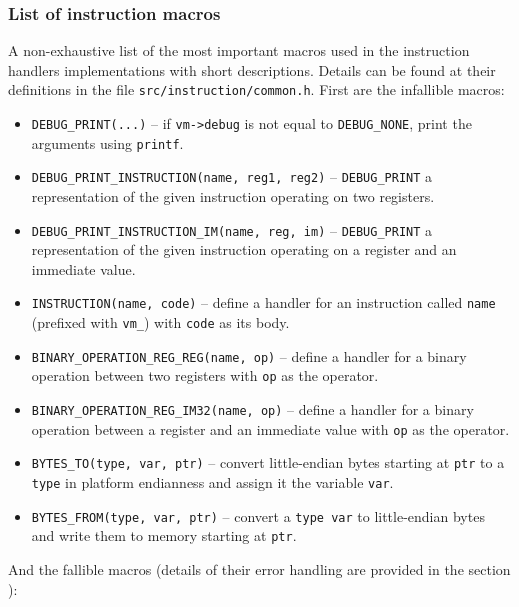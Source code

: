 \documentclass[10pt,a4paper,final]{article}
\newcommand{\code}[1]{\texttt{#1}}
\begin{document}
\subsubsection{List of instruction macros}
\label{sec:macroslist}

A non-exhaustive list of the most important macros used in the instruction
handlers implementations with short descriptions. Details can be found at their
definitions in the file \code{src/instruction/common.h}. First are the
infallible macros:

\begin{itemize}
    \item \code{DEBUG_PRINT(...)} -- if \code{vm->debug} is not equal to
        \code{DEBUG_NONE}, print the arguments using \code{printf}.
    \item \code{DEBUG_PRINT_INSTRUCTION(name, reg1, reg2)} -- \code{DEBUG_PRINT}
        a representation of the given instruction operating on two registers.
    \item \code{DEBUG_PRINT_INSTRUCTION_IM(name, reg, im)} -- \code{DEBUG_PRINT}
        a representation of the given instruction operating on a register and an
        immediate value.

    \item \code{INSTRUCTION(name, code)} -- define a handler for an instruction
        called \code{name} (prefixed with \code{vm_}) with \code{code} as its
        body.
    \item \code{BINARY_OPERATION_REG_REG(name, op)} -- define a handler for a
        binary operation between two registers with \code{op} as the operator.
    \item \code{BINARY_OPERATION_REG_IM32(name, op)} -- define a handler for a
        binary operation between a register and an immediate value with
        \code{op} as the operator.

    \item \code{BYTES_TO(type, var, ptr)} -- convert little-endian bytes
        starting at \code{ptr} to a \code{type} in platform endianness and
        assign it the variable \code{var}.
    \item \code{BYTES_FROM(type, var, ptr)} -- convert a \code{type var} to
        little-endian bytes and write them to memory starting at \code{ptr}.
\end{itemize}

And the fallible macros (details of their error handling are provided in the
section ):
\end{document}

